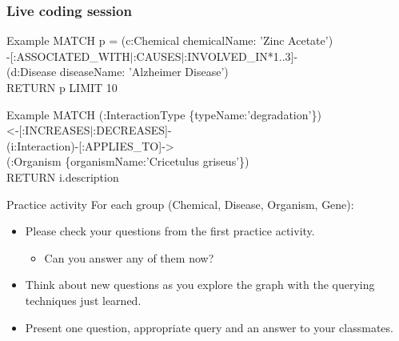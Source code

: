 \documentclass[12pt]{beamer}
\begin{document}
    \begin{frame}
        \frametitle{Live coding session}
        \begin{block}{Example}
            MATCH p = (c:Chemical {chemicalName: 'Zinc Acetate'})\\
            -[:ASSOCIATED\_WITH\(|\):CAUSES\(|\):INVOLVED\_IN*1..3]-\\
            (d:Disease {diseaseName: 'Alzheimer Disease'})\\
            \hspace{1cm} RETURN p LIMIT 10
        \end{block}
        \begin{block}{Example}
            MATCH (:InteractionType \{typeName:'degradation'\})\\
            \hspace{1cm} \textless-[:INCREASES\(|\):DECREASES]-\\
            \hspace{1cm} (i:Interaction)-[:APPLIES\_TO]-\textgreater\\
            \hspace{1cm} (:Organism \{organismName:'Cricetulus griseus'\})\\
            RETURN i.description
        \end{block}
    \end{frame}

    \begin{frame}{Practice activity}
        For each group (Chemical, Disease, Organism, Gene):
        \begin{itemize}
            \item Please check your questions from the first practice activity.
            \begin{itemize}
                \item Can you answer any of them now?
            \end{itemize}
            \item Think about new questions as you explore the graph with the querying techniques just learned.
            \item Present one question, appropriate query and an answer to your classmates.
        \end{itemize}
    \end{frame}
    
\end{document}
